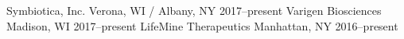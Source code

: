 

\begin{cvhonors}
  \cvhonor
    {Symbiotica, Inc.} %
    {Verona, WI / Albany, NY} %
    {2017--present} %
  \cvhonor
    {Varigen Biosciences} %
    {Madison, WI} %
    {2017--present} %
  \cvhonor
    {LifeMine Therapeutics} %
    {Manhattan, NY} %
    {2016--present} %
\end{cvhonors}